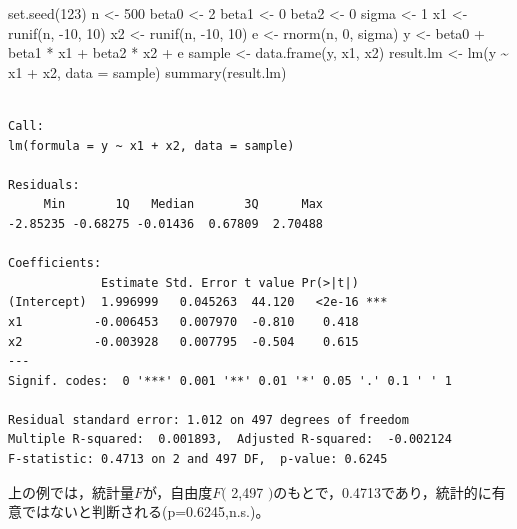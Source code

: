 \documentclass[
  a4paper,
]{ltjsbook}
\newenvironment{Shaded}{\begin{snugshade}}{\end{snugshade}}
\newcommand{\AttributeTok}[1]{\textcolor[rgb]{0.40,0.45,0.13}{#1}}
\newcommand{\DecValTok}[1]{\textcolor[rgb]{0.68,0.00,0.00}{#1}}
\newcommand{\FunctionTok}[1]{\textcolor[rgb]{0.28,0.35,0.67}{#1}}
\newcommand{\NormalTok}[1]{\textcolor[rgb]{0.00,0.23,0.31}{#1}}
\newcommand{\OtherTok}[1]{\textcolor[rgb]{0.00,0.23,0.31}{#1}}
\newcommand{\SpecialCharTok}[1]{\textcolor[rgb]{0.37,0.37,0.37}{#1}}
\begin{document}
\begin{Shaded}
\begin{Highlighting}[]
\FunctionTok{set.seed}\NormalTok{(}\DecValTok{123}\NormalTok{)}
\NormalTok{n }\OtherTok{\textless{}{-}} \DecValTok{500}
\NormalTok{beta0 }\OtherTok{\textless{}{-}} \DecValTok{2}
\NormalTok{beta1 }\OtherTok{\textless{}{-}} \DecValTok{0}
\NormalTok{beta2 }\OtherTok{\textless{}{-}} \DecValTok{0}
\NormalTok{sigma }\OtherTok{\textless{}{-}} \DecValTok{1}
\NormalTok{x1 }\OtherTok{\textless{}{-}} \FunctionTok{runif}\NormalTok{(n, }\SpecialCharTok{{-}}\DecValTok{10}\NormalTok{, }\DecValTok{10}\NormalTok{)}
\NormalTok{x2 }\OtherTok{\textless{}{-}} \FunctionTok{runif}\NormalTok{(n, }\SpecialCharTok{{-}}\DecValTok{10}\NormalTok{, }\DecValTok{10}\NormalTok{)}
\NormalTok{e }\OtherTok{\textless{}{-}} \FunctionTok{rnorm}\NormalTok{(n, }\DecValTok{0}\NormalTok{, sigma)}
\NormalTok{y }\OtherTok{\textless{}{-}}\NormalTok{ beta0 }\SpecialCharTok{+}\NormalTok{ beta1 }\SpecialCharTok{*}\NormalTok{ x1 }\SpecialCharTok{+}\NormalTok{ beta2 }\SpecialCharTok{*}\NormalTok{ x2 }\SpecialCharTok{+}\NormalTok{ e}
\NormalTok{sample }\OtherTok{\textless{}{-}} \FunctionTok{data.frame}\NormalTok{(y, x1, x2)}
\NormalTok{result.lm }\OtherTok{\textless{}{-}} \FunctionTok{lm}\NormalTok{(y }\SpecialCharTok{\textasciitilde{}}\NormalTok{ x1 }\SpecialCharTok{+}\NormalTok{ x2, }\AttributeTok{data =}\NormalTok{ sample)}
\FunctionTok{summary}\NormalTok{(result.lm)}
\end{Highlighting}
\end{Shaded}

\begin{verbatim}

Call:
lm(formula = y ~ x1 + x2, data = sample)

Residuals:
     Min       1Q   Median       3Q      Max 
-2.85235 -0.68275 -0.01436  0.67809  2.70488 

Coefficients:
             Estimate Std. Error t value Pr(>|t|)    
(Intercept)  1.996999   0.045263  44.120   <2e-16 ***
x1          -0.006453   0.007970  -0.810    0.418    
x2          -0.003928   0.007795  -0.504    0.615    
---
Signif. codes:  0 '***' 0.001 '**' 0.01 '*' 0.05 '.' 0.1 ' ' 1

Residual standard error: 1.012 on 497 degrees of freedom
Multiple R-squared:  0.001893,  Adjusted R-squared:  -0.002124 
F-statistic: 0.4713 on 2 and 497 DF,  p-value: 0.6245
\end{verbatim}

上の例では，統計量\(F\)が，自由度\(F(\) 2,497
\()\)のもとで，0.4713であり，統計的に有意ではないと判断される(p=0.6245,n.s.)。
\end{document}
